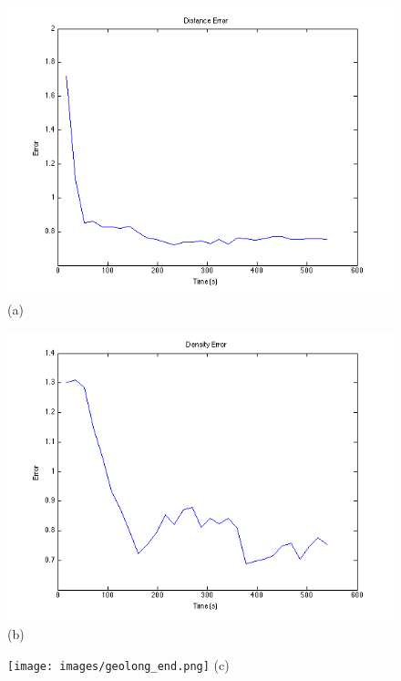 \documentclass[oneside, a4paper, 12pt]{memoir}
\begin{document}
				\begin{figure}[!htp]
					\begin{minipage}{0.5\textwidth}
						\includegraphics[width=\textwidth]{../MATLAB/boxplot_geolong_distance.png}
						\centering (a)
					\end{minipage}
					\hfill
					\begin{minipage}{0.5\textwidth}
						\includegraphics[width=\textwidth]{../MATLAB/boxplot_geolong_density.png}
						\centering (b)
					\end{minipage}
					\center \texttt{[image: images/geolong\_end.png]}
					\center (c)
					

\end{figure}
\end{document}
